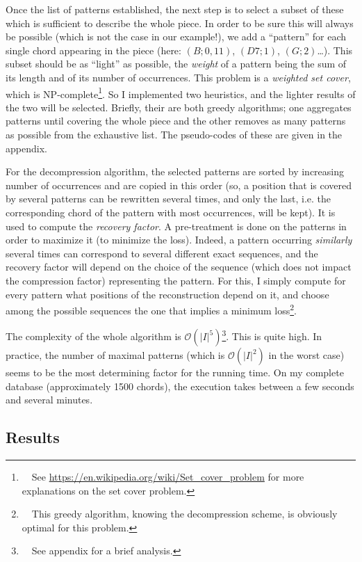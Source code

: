 \documentclass[a4paper,10pt]{article}
\newcommand{\guill}[1]{``#1''}
\newcommand{\bigO}[1]{\mathcal O\left( #1 \right)}
\begin{document}
Once the list of patterns established, the next step is to select a subset of these which is sufficient to describe the whole piece. In order to be sure this will always be possible (which is not the case in our example!), we add a \guill{pattern} for each single chord appearing in the piece (here: $(B;0,11)$, $(D7;1)$, $(G;2)$\dots). This subset should be as \guill{light} as possible, the \emph{weight} of a pattern being the sum of its length and of its number of occurrences. This problem is a \emph{weighted set cover}, which is NP-complete\footnote{~~See \href{https://en.wikipedia.org/wiki/Set\_cover\_problem}{https://en.wikipedia.org/wiki/Set\_cover\_problem} for more explanations on the set cover problem.}. So I implemented two heuristics, and the lighter results of the two will be selected. Briefly, their are both greedy algorithms; one aggregates patterns until covering the whole piece and the other removes as many patterns as possible from the exhaustive list. The pseudo-codes of these are given in the appendix.

For the decompression algorithm, the selected patterns are sorted by increasing number of occurrences and are copied in this order (so, a position that is covered by several patterns can be rewritten several times, and only the last, i.\!e. the corresponding chord of the pattern with most occurrences, will be kept). It is used to compute the \emph{recovery factor}. A pre-treatment is done on the patterns in order to maximize it (to minimize the loss). Indeed, a pattern occurring \emph{similarly} several times can correspond to several different exact sequences, and the recovery factor will depend on the choice of the sequence (which does not impact the compression factor) representing the pattern. For this, I simply compute for every pattern what positions of the reconstruction depend on it, and choose among the possible sequences the one that implies a minimum loss\footnote{~~This greedy algorithm, knowing the decompression scheme, is obviously optimal for this problem.}.

The complexity of the whole algorithm is $\bigO{|I|^5}$\footnote{~~See appendix for a brief analysis.}. This is quite high. In practice, the number of maximal patterns (which is $\bigO{|I|^2}$ in the worst case) seems to be the most determining factor for the running time. On my complete database (approximately 1500 chords), the execution takes between a few seconds and several minutes.


\subsection{Results}
\end{document}
